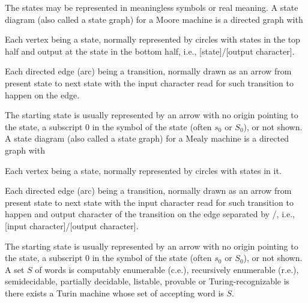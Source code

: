 \documentclass[a4paper,12pt]{article}
\begin{document}
The states may be represented in meaningless symbols or real meaning.
A state diagram (also called a state graph) for a Moore machine is a directed graph with
\bit
\item Each vertex being a state, normally represented by circles with states in the top half and output at the state in the bottom half, i.e., [state]/[output character].
\item Each directed edge (arc) being a transition, normally drawn as an arrow from present state to next state with the input character read for such transition to happen on the edge.
\item The starting state is usually represented by an arrow with no origin pointing to the state, a subscript 0 in the symbol of the state (often $s_0$ or $S_0$), or not shown.
\eit
{}
A state diagram (also called a state graph) for a Mealy machine is a directed graph with
\bit
\item Each vertex being a state, normally represented by circles with states in it.
\item Each directed edge (arc) being a transition, normally drawn as an arrow from present state to next state with the input character read for such transition to happen and output character of the transition on the edge separated by /, i.e., [input character]/[output character].
\item The starting state is usually represented by an arrow with no origin pointing to the state, a subscript 0 in the symbol of the state (often $s_0$ or $S_0$), or not shown.
\eit
{}
A set $S$ of words is computably enumerable (c.e.), recursively enumerable (r.e.), semidecidable, partially decidable, listable, provable or Turing-recognizable is there exists a Turin machine whose set of accepting word is $S$.
\end{document}
